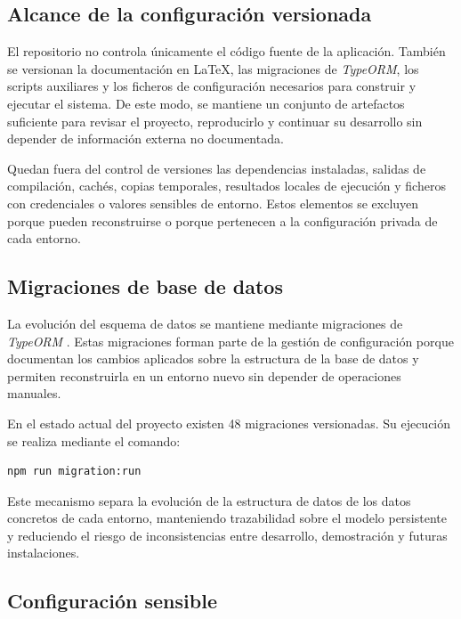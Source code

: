 \subsection{Alcance de la configuración versionada}

El repositorio no controla únicamente el código fuente de la aplicación. También se versionan la documentación en \LaTeX{}, las migraciones de \textit{TypeORM}, los scripts auxiliares y los ficheros de configuración necesarios para construir y ejecutar el sistema. De este modo, se mantiene un conjunto de artefactos suficiente para revisar el proyecto, reproducirlo y continuar su desarrollo sin depender de información externa no documentada.

Quedan fuera del control de versiones las dependencias instaladas, salidas de compilación, cachés, copias temporales, resultados locales de ejecución y ficheros con credenciales o valores sensibles de entorno. Estos elementos se excluyen porque pueden reconstruirse o porque pertenecen a la configuración privada de cada entorno.

\subsection{Migraciones de base de datos}

La evolución del esquema de datos se mantiene mediante migraciones de \textit{TypeORM} \citep{typeormmigrations2026}. Estas migraciones forman parte de la gestión de configuración porque documentan los cambios aplicados sobre la estructura de la base de datos y permiten reconstruirla en un entorno nuevo sin depender de operaciones manuales.

En el estado actual del proyecto existen 48 migraciones versionadas. Su ejecución se realiza mediante el comando:

\begin{lstlisting}[language=bash]
npm run migration:run
\end{lstlisting}

Este mecanismo separa la evolución de la estructura de datos de los datos concretos de cada entorno, manteniendo trazabilidad sobre el modelo persistente y reduciendo el riesgo de inconsistencias entre desarrollo, demostración y futuras instalaciones.

\subsection{Configuración sensible}

